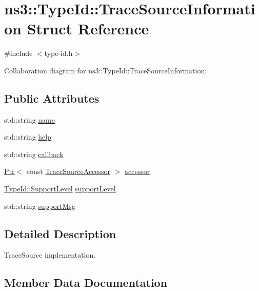 \hypertarget{structns3_1_1TypeId_1_1TraceSourceInformation}{}\section{ns3\+:\+:Type\+Id\+:\+:Trace\+Source\+Information Struct Reference}
\label{structns3_1_1TypeId_1_1TraceSourceInformation}


{\ttfamily \#include $<$type-\/id.\+h$>$}



Collaboration diagram for ns3\+:\+:Type\+Id\+:\+:Trace\+Source\+Information\+:
\subsection*{Public Attributes}
\begin{DoxyCompactItemize}
\item 
std\+::string \hyperlink{structns3_1_1TypeId_1_1TraceSourceInformation_a269c71739630feb8d42333eedff58fb0}{name}
\item 
std\+::string \hyperlink{structns3_1_1TypeId_1_1TraceSourceInformation_a6c633e149439dfc7e325e9f24a9966f0}{help}
\item 
std\+::string \hyperlink{structns3_1_1TypeId_1_1TraceSourceInformation_ab88a91bae633604934a607053b1692ef}{callback}
\item 
\hyperlink{classns3_1_1Ptr}{Ptr}$<$ const \hyperlink{classns3_1_1TraceSourceAccessor}{Trace\+Source\+Accessor} $>$ \hyperlink{structns3_1_1TypeId_1_1TraceSourceInformation_aa9ad61222c0614fa5b146f132c2f2ad3}{accessor}
\item 
\hyperlink{classns3_1_1TypeId_ad55d31e57490a83a3ededa096a8d2588}{Type\+Id\+::\+Support\+Level} \hyperlink{structns3_1_1TypeId_1_1TraceSourceInformation_ae798a80cfd0ea174ae9483b01623f4c0}{support\+Level}
\item 
std\+::string \hyperlink{structns3_1_1TypeId_1_1TraceSourceInformation_a5934caf8d6adea8d3ff8c1df15aa6837}{support\+Msg}
\end{DoxyCompactItemize}


\subsection{Detailed Description}
Trace\+Source implementation. 

\subsection{Member Data Documentation}
